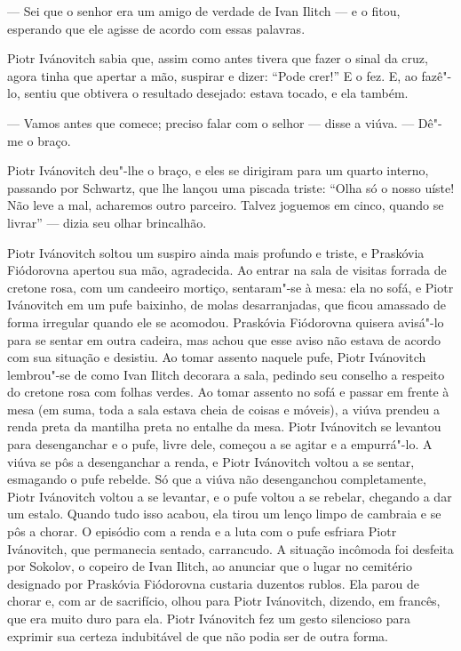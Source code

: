 --- Sei que o senhor era um amigo de verdade de Ivan Ilitch --- e o fitou,
esperando que ele agisse de acordo com essas palavras.

Piotr Ivánovitch sabia que, assim como antes tivera que fazer o sinal da
cruz, agora tinha que apertar a mão, suspirar e dizer: ``Pode crer!'' E
o fez. E, ao fazê"-lo, sentiu que obtivera o resultado desejado: estava
tocado, e ela também.

--- Vamos antes que comece; preciso falar com o selhor --- disse a viúva. ---
Dê"-me o braço.

Piotr Ivánovitch deu"-lhe o braço, e eles se dirigiram para um quarto
interno, passando por Schwartz, que lhe lançou uma piscada triste:
``Olha só o nosso uíste! Não leve a mal, acharemos outro parceiro.
Talvez joguemos em cinco, quando se livrar'' --- dizia seu olhar
brincalhão.

Piotr Ivánovitch soltou um suspiro ainda mais profundo e triste, e
Praskóvia Fiódorovna apertou sua mão, agradecida. Ao entrar na sala de
visitas forrada de cretone rosa, com um candeeiro mortiço, sentaram"-se à
mesa: ela no sofá, e Piotr Ivánovitch em um pufe baixinho, de molas
desarranjadas, que ficou amassado de forma irregular quando ele se
acomodou. Praskóvia Fiódorovna quisera avisá"-lo para se sentar em outra
cadeira, mas achou que esse aviso não estava de acordo com sua situação
e desistiu. Ao tomar assento naquele pufe, Piotr Ivánovitch lembrou"-se
de como Ivan Ilitch decorara a sala, pedindo seu conselho a respeito do
cretone rosa com folhas verdes. Ao tomar assento no sofá e passar em
frente à mesa (em suma, toda a sala estava cheia de coisas e móveis), a
viúva prendeu a renda preta da mantilha preta no entalhe da mesa. Piotr
Ivánovitch se levantou para desenganchar e o pufe, livre dele, começou a
se agitar e a empurrá"-lo. A viúva se pôs a desenganchar a renda, e Piotr
Ivánovitch voltou a se sentar, esmagando o pufe rebelde. Só que a viúva
não desenganchou completamente, Piotr Ivánovitch voltou a se levantar, e
o pufe voltou a se rebelar, chegando a dar um estalo. Quando tudo isso
acabou, ela tirou um lenço limpo de cambraia e se pôs a chorar. O
episódio com a renda e a luta com o pufe esfriara Piotr Ivánovitch, que
permanecia sentado, carrancudo. A situação incômoda foi desfeita por
Sokolov, o copeiro de Ivan Ilitch, ao anunciar que o lugar no cemitério
designado por Praskóvia Fiódorovna custaria duzentos rublos. Ela parou
de chorar e, com ar de sacrifício, olhou para Piotr Ivánovitch, dizendo,
em francês, que era muito duro para ela. Piotr Ivánovitch fez um gesto
silencioso para exprimir sua certeza indubitável de que não podia ser de
outra forma.

